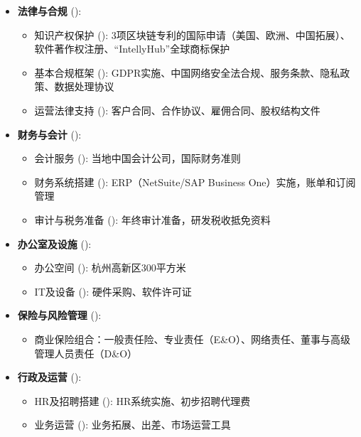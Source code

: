 \documentclass[11点, A4纸, 单面]{article}
\begin{document}
\begin{itemize}
    \item \textbf{法律与合规} ():
    \begin{itemize}
        \item 知识产权保护 (): 3项区块链专利的国际申请（美国、欧洲、中国拓展）、软件著作权注册、“IntellyHub”全球商标保护
        \item 基本合规框架 (): GDPR实施、中国网络安全法合规、服务条款、隐私政策、数据处理协议
        \item 运营法律支持 (): 客户合同、合作协议、雇佣合同、股权结构文件
    \end{itemize}
    
    \item \textbf{财务与会计} ():
    \begin{itemize}
        \item 会计服务 (): 当地中国会计公司，国际财务准则
        \item 财务系统搭建 (): ERP（NetSuite/SAP Business One）实施，账单和订阅管理
        \item 审计与税务准备 (): 年终审计准备，研发税收抵免资料
    \end{itemize}
    
    \item \textbf{办公室及设施} ():
    \begin{itemize}
        \item 办公空间 (): 杭州高新区300平方米
        \item IT及设备 (): 硬件采购、软件许可证
    \end{itemize}
    
    \item \textbf{保险与风险管理} ():
    \begin{itemize}
        \item 商业保险组合：一般责任险、专业责任（E\&O）、网络责任、董事与高级管理人员责任（D\&O）
    \end{itemize}
    
    \item \textbf{行政及运营} ():
    \begin{itemize}
        \item HR及招聘搭建 (): HR系统实施、初步招聘代理费
        \item 业务运营 (): 业务拓展、出差、市场运营工具
    \end{itemize}
\end{itemize}
\end{document}
